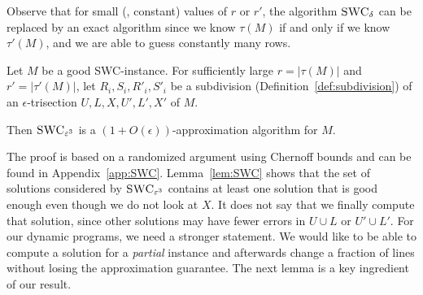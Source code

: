 Observe that for small (\ie, constant) values of $r$ or $r'$, the algorithm $\textsc{SWC}_\delta$ can be replaced by an exact algorithm since we know $\tau(M)$ if and only if we know $\tau'(M)$, and we are able to guess constantly many rows.

\begin{lemma}\label{lem:SWC}
    Let $M$ be a good SWC-instance.
    For sufficiently large $r = |\tau(M)|$ and $r' = |\tau'(M)|$, let $R_i, S_i, R'_i, S'_i$ be a subdivision (Definition~\ref{def:subdivision}) of an $\epsilon$-trisection $U,L,X,U',L',X'$ of $M$.

    Then $\textsc{SWC}_{\epsilon^3}$ is a $(1 + O(\epsilon))$-approximation algorithm for $M$. 
\end{lemma}
The proof is based on a randomized argument using Chernoff bounds and can be found in Appendix~\ref{app:SWC}.
%
Lemma~\ref{lem:SWC} shows that the set of solutions considered by $\SWC$ contains at least one solution that is good enough even though we do not look at $X$. 
It does not say that we finally compute that solution, since other solutions may have fewer errors in $U\cup L$ or $U' \cup L'$.
For our dynamic programs, we need a stronger statement.
We would like to be able to compute a solution for a \emph{partial} instance and afterwards change a fraction of lines without losing the approximation guarantee.
The next lemma is a key ingredient of our result.

